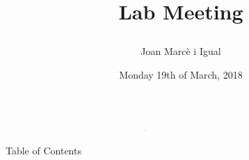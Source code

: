 \documentclass[xcolor={x11names, table}, compress]{beamer}
\begin{document}
{ 
    \begin{frame}
        \vspace{-1.5cm}
        \hfill{}
        \begin{flushleft}
            \hspace{-1cm}\includegraphics[width=0.8\textwidth, height=0.4em]{title_line.pdf}\hfill
            
            \title{
                \begin{flushleft}{
                    \huge \color{BHKpresentationDark} 
                    Lab Meeting
                } 
                \end{flushleft}
            }
            
            \vspace{-.5cm}
            \date{Monday 19th of March, 2018}
            \author[Joan]{\begin{flushleft}\vspace{-1cm} Joan Marcè i Igual\end{flushleft}}
            \titlepage{}
        \end{flushleft}
    \end{frame}
}

\begin{frame}{Table of Contents}
	\tableofcontents
\end{frame}




\end{document}
